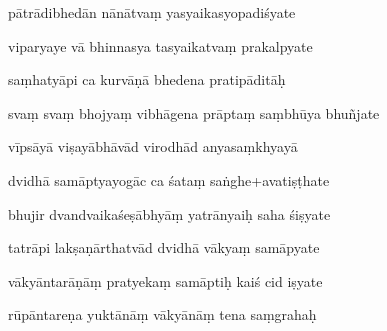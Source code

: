 \documentclass[article,12pt,a4paper]{memoir}%
\newcounter{parCount}
\begin{document}
	  
	  \pstart {} pātrādibhedān nānātvaṃ yasyaikasyopadiśyate 
	{}
	\pend%
      

	  
	  \pstart \leavevmode%
	viparyaye vā bhinnasya tasyaikatvaṃ prakalpyate 
	{}
	\pend%
      

	  
	  \pstart {} saṃhatyāpi ca kurvāṇā bhedena pratipāditāḥ 
	{}
	\pend%
      

	  
	  \pstart \leavevmode%
	svaṃ svaṃ bhojyaṃ vibhāgena prāptaṃ saṃbhūya bhuñjate 
	{}
	\pend%
      

	  
	  \pstart {} vīpsāyā viṣayābhāvād virodhād anyasaṃkhyayā 
	{}
	\pend%
      

	  
	  \pstart \leavevmode%
	dvidhā samāptyayogāc ca śataṃ saṅghe+avatiṣṭhate 
	{}
	\pend%
      

	  
	  \pstart {} bhujir dvandvaikaśeṣābhyāṃ yatrānyaiḥ saha śiṣyate 
	{}
	\pend%
      

	  
	  \pstart \leavevmode%
	tatrāpi lakṣaṇārthatvād dvidhā vākyaṃ samāpyate 
	{}
	\pend%
      

	  
	  \pstart {} vākyāntarāṇāṃ pratyekaṃ samāptiḥ kaiś cid iṣyate 
	{}
	\pend%
      

	  
	  \pstart \leavevmode%
	rūpāntareṇa yuktānāṃ vākyānāṃ tena saṃgrahaḥ 
	{}
	\pend%
      
\end{document}

